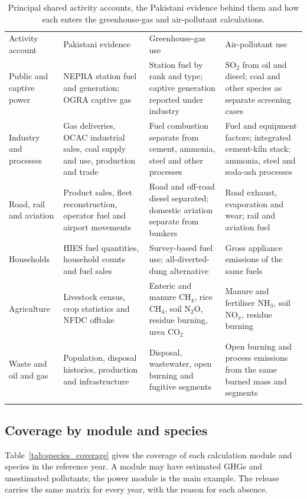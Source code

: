 \documentclass[essd,manuscript]{copernicus}
\begin{document}
\begin{table}[t]
\caption{Principal shared activity accounts, the Pakistani evidence behind them and how each enters the greenhouse-gas and air-pollutant calculations.}
\label{tab:coverage}
\small
\begin{tabularx}{\textwidth}{p{}XXX}
\tophline
Activity account & Pakistani evidence & Greenhouse-gas use & Air-pollutant use \\
\middlehline
Public and captive power & NEPRA station fuel and generation; OGRA captive gas & Station fuel by rank and type; captive generation reported under industry & SO$_2$ from oil and diesel; coal and other species as separate screening cases \\
Industry and processes & Gas deliveries, OCAC industrial sales, coal supply and use, production and trade & Fuel combustion separate from cement, ammonia, steel and other processes & Fuel and equipment factors; integrated cement-kiln stack; ammonia, steel and soda-ash processes \\
Road, rail and aviation & Product sales, fleet reconstruction, operator fuel and airport movements & Road and off-road diesel separated; domestic aviation separate from bunkers & Road exhaust, evaporation and wear; rail and aviation fuel \\
Households & HIES fuel quantities, household counts and fuel sales & Survey-based fuel use; all-diverted-dung alternative & Gross appliance emissions of the same fuels \\
Agriculture & Livestock census, crop statistics and NFDC offtake & Enteric and manure CH$_4$, rice CH$_4$, soil N$_2$O, residue burning, urea CO$_2$ & Manure and fertiliser NH$_3$, soil NO$_x$, residue burning \\
Waste and oil and gas & Population, disposal histories, production and infrastructure & Disposal, wastewater, open burning and fugitive segments & Open burning and process emissions from the same burned mass and segments \\
\bottomhline
\end{tabularx}
\end{table}

\subsection{Coverage by module and species}
Table~\ref{tab:species_coverage} gives the coverage of each calculation module and species in the reference year. A module may have estimated GHGs and unestimated pollutants; the power module is the main example. The release carries the same matrix for every year, with the reason for each absence.
\end{document}
